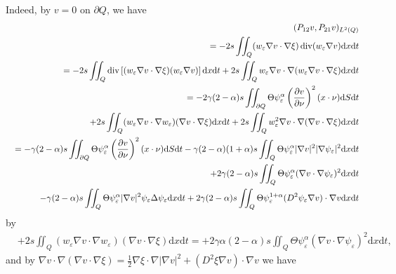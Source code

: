 \documentclass[11pt]{article}
\numberwithin{equation}{section}
\def\df{\mathrm d}
\DeclareMathOperator{\Div}{div}
\begin{document}
Indeed, by $v = 0$ on $\partial Q$, we have
\begin{eqnarray*}
&&(P_{12}v,P_{21}v)_{L^2(Q)}\\
&&= -2s\iint_Q (w_\varepsilon \nabla v \cdot \nabla \xi )\Div(w_\varepsilon \nabla v)\df x\df t\\
&&= -2s\iint_Q\Div\left[(w_\varepsilon \nabla v \cdot\nabla \xi)(w_\varepsilon\nabla v)\right]\df x\df t + 2s\iint_Q w_\varepsilon \nabla v \cdot \nabla (w_\varepsilon \nabla v \cdot \nabla\xi)\df x\df t\\
&&= -2\gamma(2-\alpha)s\iint_{\partial Q} \Theta \psi_\varepsilon^\alpha\left(\frac{\partial v}{\partial \nu}\right)^2(x\cdot\nu)\df S\df t\\
&&\hspace{4.5mm}+2s\iint_Q (w_\varepsilon\nabla v \cdot \nabla w_\varepsilon)(\nabla v\cdot\nabla\xi)\df x\df t + 2s\iint_Q w_\varepsilon^2\nabla v \cdot\nabla (\nabla v\cdot \nabla \xi)\df x\df t\\
&&= -\gamma(2-\alpha)s\iint_{\partial Q}\Theta \psi_\varepsilon^\alpha \left(\frac{\partial v}{\partial \nu}\right)^2(x\cdot \nu)\df S\df t - \gamma(2-\alpha)(1+\alpha)s\iint_Q\Theta \psi_\varepsilon^\alpha |\nabla v|^2|\nabla\psi_\varepsilon|^2\df x\df t\\
&&\hspace{4.5mm}+2\gamma(2-\alpha)s\iint_Q\Theta \psi_\varepsilon^\alpha (\nabla v\cdot\nabla \psi_\varepsilon)^2\df x\df t\\
&&\hspace{4.5mm}-\gamma(2-\alpha)s\iint_Q\Theta \psi_\varepsilon^\alpha|\nabla v|^2\psi_\varepsilon \Delta\psi_\varepsilon\df x\df t + 2\gamma(2-\alpha)s\iint_Q\Theta \psi_\varepsilon^{1+\alpha}(D^2\psi_\varepsilon\nabla v)\cdot \nabla v\df x\df t
\end{eqnarray*}
by
\begin{equation*}
\begin{split}
&+2s\iint_Q (w_\varepsilon \nabla v\cdot\nabla w_\varepsilon)(\nabla v\cdot \nabla \xi)\df x\df t = +2\gamma\alpha(2-\alpha)s\iint_Q \Theta \psi_\varepsilon^\alpha (\nabla v\cdot\nabla \psi_\varepsilon)^2\df x\df t,
\end{split}
\end{equation*}
and by $\nabla v\cdot \nabla (\nabla v\cdot \nabla \xi)=\frac{1}{2}\nabla \xi \cdot \nabla |\nabla v|^2+(D^2\xi \nabla v)\cdot \nabla v$ we have
\end{document}
